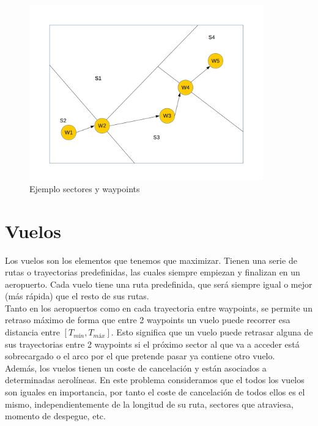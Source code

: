 \begin{figure}[H]
	\begin{center}
		\centering
		\includegraphics[width=0.9\textwidth]{./imagenes/descripcion_problema/sectoresYWaypoints.jpg}
		\caption{Ejemplo sectores y waypoints}
		\label{fig: Ejemplo sectores y waypoints}
	\end{center}
\end{figure}

\section{Vuelos}
Los vuelos son los elementos que tenemos que maximizar. Tienen una serie de rutas o trayectorias predefinidas, las cuales siempre empiezan y finalizan en un aeropuerto. Cada vuelo tiene una ruta predefinida, que será siempre igual o mejor (más rápida) que el resto de sus rutas.\\
Tanto en los aeropuertos como en cada trayectoria entre waypoints, se permite un retraso máximo de forma que entre 2 waypoints un vuelo puede recorrer esa distancia entre $[T_{mín}, T_{máx}]$. Esto significa que un vuelo puede retrasar alguna de sus trayectorias entre 2 waypoints si el próximo sector al que va a acceder está sobrecargado o el arco por el que pretende pasar ya contiene otro vuelo.\\

Además, los vuelos tienen un coste de cancelación y están asociados a determinadas aerolíneas. En este problema consideramos que el todos los vuelos son iguales en importancia, por tanto el coste de cancelación de todos ellos es el mismo, independientemente de la longitud de su ruta, sectores que atraviesa, momento de despegue, etc.\\

